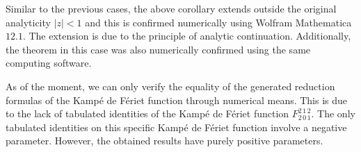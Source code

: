 Similar to the previous cases, the above corollary extends outside the original analyticity $|z| < 1$ and this is confirmed numerically using Wolfram Mathematica $12.1$. The extension is due to the principle of analytic continuation. Additionally, the theorem in this case was also numerically confirmed using the same computing software.

As of the moment, we can only verify the equality of the generated reduction formulas of the Kampé de Fériet function through numerical means. This is due to the lack of tabulated identities of the Kampé de Fériet function $ F^{2 \, 1 \, 2}_{2 \, 0 \, 1}$. The only tabulated identities on this specific Kampé de Fériet function involve a negative parameter. However, the obtained results have purely positive parameters. 